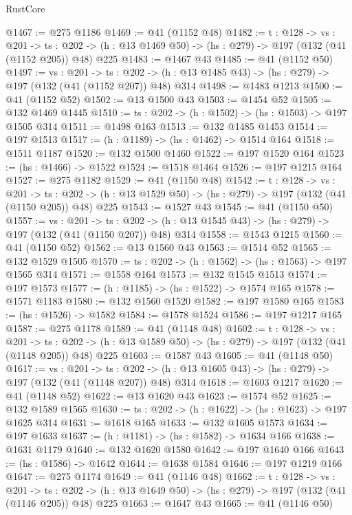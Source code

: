 \begin{lexlean}{RustCore}
\begin{coremodule}
@1467 := @275 @1186
@1469 := @41 (@1152 @48)
@1482 := {t : @128} ->
  {vs : @201} ->
  {ts : @202} -> (h : @13 @1469 @50) -> (hs : @279) -> @197 (@132 (@41 (@1152 @205)) @48) @225
@1483 := @1467 @43
@1485 := @41 (@1152 @50)
@1497 := {vs : @201} ->
  {ts : @202} -> (h : @13 @1485 @43) -> (hs : @279) -> @197 (@132 (@41 (@1152 @207)) @48) @314
@1498 := @1483 @1213
@1500 := @41 (@1152 @52)
@1502 := @13 @1500 @43
@1503 := @1454 @52
@1505 := @132 @1469 @1445
@1510 := {ts : @202} -> (h : @1502) -> (hs : @1503) -> @197 @1505 @314
@1511 := @1498 @163
@1513 := @132 @1485 @1453
@1514 := @197 @1513
@1517 := (h : @1189) -> (hs : @1462) -> @1514 @164
@1518 := @1511 @1187
@1520 := @132 @1500 @1460
@1522 := @197 @1520 @164
@1523 := (hs : @1466) -> @1522
@1524 := @1518 @1464
@1526 := @197 @1215 @164
@1527 := @275 @1182
@1529 := @41 (@1150 @48)
@1542 := {t : @128} ->
  {vs : @201} ->
  {ts : @202} -> (h : @13 @1529 @50) -> (hs : @279) -> @197 (@132 (@41 (@1150 @205)) @48) @225
@1543 := @1527 @43
@1545 := @41 (@1150 @50)
@1557 := {vs : @201} ->
  {ts : @202} -> (h : @13 @1545 @43) -> (hs : @279) -> @197 (@132 (@41 (@1150 @207)) @48) @314
@1558 := @1543 @1215
@1560 := @41 (@1150 @52)
@1562 := @13 @1560 @43
@1563 := @1514 @52
@1565 := @132 @1529 @1505
@1570 := {ts : @202} -> (h : @1562) -> (hs : @1563) -> @197 @1565 @314
@1571 := @1558 @164
@1573 := @132 @1545 @1513
@1574 := @197 @1573
@1577 := (h : @1185) -> (hs : @1522) -> @1574 @165
@1578 := @1571 @1183
@1580 := @132 @1560 @1520
@1582 := @197 @1580 @165
@1583 := (hs : @1526) -> @1582
@1584 := @1578 @1524
@1586 := @197 @1217 @165
@1587 := @275 @1178
@1589 := @41 (@1148 @48)
@1602 := {t : @128} ->
  {vs : @201} ->
  {ts : @202} -> (h : @13 @1589 @50) -> (hs : @279) -> @197 (@132 (@41 (@1148 @205)) @48) @225
@1603 := @1587 @43
@1605 := @41 (@1148 @50)
@1617 := {vs : @201} ->
  {ts : @202} -> (h : @13 @1605 @43) -> (hs : @279) -> @197 (@132 (@41 (@1148 @207)) @48) @314
@1618 := @1603 @1217
@1620 := @41 (@1148 @52)
@1622 := @13 @1620 @43
@1623 := @1574 @52
@1625 := @132 @1589 @1565
@1630 := {ts : @202} -> (h : @1622) -> (hs : @1623) -> @197 @1625 @314
@1631 := @1618 @165
@1633 := @132 @1605 @1573
@1634 := @197 @1633
@1637 := (h : @1181) -> (hs : @1582) -> @1634 @166
@1638 := @1631 @1179
@1640 := @132 @1620 @1580
@1642 := @197 @1640 @166
@1643 := (hs : @1586) -> @1642
@1644 := @1638 @1584
@1646 := @197 @1219 @166
@1647 := @275 @1174
@1649 := @41 (@1146 @48)
@1662 := {t : @128} ->
  {vs : @201} ->
  {ts : @202} -> (h : @13 @1649 @50) -> (hs : @279) -> @197 (@132 (@41 (@1146 @205)) @48) @225
@1663 := @1647 @43
@1665 := @41 (@1146 @50)

\end{coremodule}
\end{lexlean}
